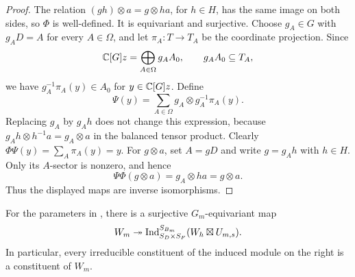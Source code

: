 \begin{proof}
The relation $(gh)\otimes a=g\otimes ha$, for $h\in H$, has the
same image on both sides, so $\Phi$ is well-defined.  It is equivariant
and surjective.  Choose $g_A\in G$ with $g_AD=A$ for every $A\in\Omega$,
and let $\pi_A:T\to T_A$ be the coordinate projection.  Since
\[
 \mathbb C[G]z=\bigoplus_{A\in\Omega}g_AA_0,
 \qquad g_AA_0\subseteq T_A,
\]
we have $g_A^{-1}\pi_A(y)\in A_0$ for $y\in\mathbb C[G]z$.  Define
\begin{equation}\label{band:induced-inverse}
 \Psi(y)=\sum_{A\in\Omega}
          g_A\otimes g_A^{-1}\pi_A(y).
\end{equation}
Replacing $g_A$ by $g_Ah$ does not change this expression, because
$g_Ah\otimes h^{-1}a=g_A\otimes a$ in the balanced tensor product.
Clearly $\Phi\Psi(y)=\sum_A\pi_A(y)=y$.
For $g\otimes a$, set $A=gD$ and write $g=g_Ah$ with $h\in H$.
Only its $A$-sector is nonzero, and hence
\[
 \Psi\Phi(g\otimes a)=g_A\otimes ha=g\otimes a.
\]
Thus the displayed maps are inverse isomorphisms.
\end{proof}

\begin{proposition}\label{prop:band-quotient}
For the parameters in , there is a surjective
$G_m$-equivariant map
\begin{equation}\label{band:quotient}
 W_m\twoheadrightarrow
 \operatorname{Ind}_{S_D\times S_F}^{S_{B_m}}(W_h\boxtimes U_{m,s}).
\end{equation}
In particular, every irreducible constituent of the induced module on
the right is a constituent of $W_m$.
\end{proposition}


